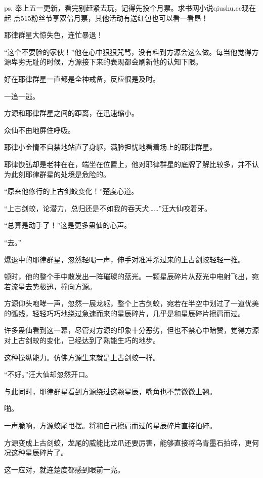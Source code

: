 
\begin{this_body}

ps. 奉上五一更新，看完别赶紧去玩，记得先投个月票。求书网小说qiushu.cc现在起-点515粉丝节享双倍月票，其他活动有送红包也可以看一看昂！

耶律群星大惊失色，连忙暴退！

“这个不要脸的家伙！”他在心中狠狠咒骂，没有料到方源会这么做。每当他觉得方源卑劣无耻的时候，方源接下来的表现都会刷新他的认知下限。

好在耶律群星一直都是全神戒备，反应很是及时。

一追一逃。

方源和耶律群星之间的距离，在迅速缩小。

众仙不由地屏住呼吸。

耶律小金情不自禁地站直了身躯，满脸担忧地看着场上的耶律群星。

耶律恢弘却是老神在在，端坐在位置上，他对耶律群星的底牌了解比较多，并不认为此刻耶律群星的处境是危险的。

“原来他修行的上古剑蛟变化！”楚度心道。

“上古剑蛟，论潜力，总归还是不如我的吞天犬……”汪大仙咬着牙。

“总算是动手了！”这是更多蛊仙的心声。

“去。”

爆退中的耶律群星，忽然轻喝一声，伸手对准冲杀过来的上古剑蛟轻轻一推。

顿时，他的整个手中散发出一阵璀璨的蓝光。一颗星辰碎片从蓝光中电射飞出，宛若流星去势极迅，撞向方源。

方源仰头咆哮一声，忽然一展龙躯，整个上古剑蛟，宛若在半空中划过了一道优美的弧线，轻轻巧巧地绕过急速而来的星辰碎片，几乎是和星辰碎片擦肩而过。

许多蛊仙看到这一幕，尽管对方源的印象十分恶劣，但也不禁心中暗赞，觉得方源对上古剑蛟的变化，已经达到了熟能生巧的地步。

这种操纵能力。仿佛方源生来就是上古剑蛟一样。

“不好。”汪大仙却忽然开口。

与此同时，耶律群星看到方源绕过这颗星辰，嘴角也不禁微微上翘。

啪。

一声脆响，方源蛟尾甩摆。将和自己擦肩而过的星辰碎片直接拍碎。

方源变成上古剑蛟，龙尾的威能比龙爪还要厉害，能够直接将乌青墨石拍碎，更何况这种星辰碎片了。

这一应对，就连楚度都感到眼前一亮。


\end{this_body}
